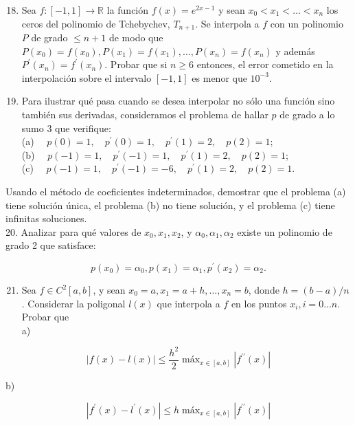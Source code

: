 \documentclass[10pt]{book}
\begin{document}
\begin{enumerate}
  \setcounter{enumi}{17}
  \item Sea $f:[-1,1] \rightarrow \mathbb{R}$ la función $f(x)=e^{2 x-1}$ y sean $x_{0}<x_{1}<\ldots<x_{n}$ los ceros del polinomio de Tchebychev, $T_{n+1}$. Se interpola a $f$ con un polinomio $P$ de grado $\leq n+1$ de modo que $P\left(x_{0}\right)=f\left(x_{0}\right), P\left(x_{1}\right)=f\left(x_{1}\right), \ldots, P\left(x_{n}\right)=f\left(x_{n}\right)$ y además $P^{\prime}\left(x_{n}\right)=f^{\prime}\left(x_{n}\right)$. Probar que si $n \geq 6$ entonces, el error cometido en la interpolación sobre el intervalo $[-1,1]$ es menor que $10^{-3}$.
  \item Para ilustrar qué pasa cuando se desea interpolar no sólo una función sino también sus derivadas, consideramos el problema de hallar $p$ de grado a lo sumo 3 que verifique:\\
(a) $\quad p(0)=1, \quad p^{\prime}(0)=1, \quad p^{\prime}(1)=2, \quad p(2)=1 ;$\\
(b) $\quad p(-1)=1, \quad p^{\prime}(-1)=1, \quad p^{\prime}(1)=2, \quad p(2)=1$;\\
(c) $\quad p(-1)=1, \quad p^{\prime}(-1)=-6, \quad p^{\prime}(1)=2, \quad p(2)=1$.
\end{enumerate}

Usando el método de coeficientes indeterminados, demostrar que el problema (a) tiene solución única, el problema (b) no tiene solución, y el problema (c) tiene infinitas soluciones.\\
20. Analizar para qué valores de $x_{0}, x_{1}, x_{2}$, y $\alpha_{0}, \alpha_{1}, \alpha_{2}$ existe un polinomio de grado 2 que satisface:

$$
p\left(x_{0}\right)=\alpha_{0}, p\left(x_{1}\right)=\alpha_{1}, p^{\prime}\left(x_{2}\right)=\alpha_{2} .
$$

\begin{enumerate}
  \setcounter{enumi}{20}
  \item Sea $f \in C^{2}[a, b]$, y sean $x_{0}=a, x_{1}=a+h, \ldots, x_{n}=b$, donde $h=(b-a) / n$. Considerar la poligonal $l(x)$ que interpola a $f$ en los puntos $x_{i}, i=0 \ldots n$. Probar que\\
a)
\end{enumerate}

$$
|f(x)-l(x)| \leq \frac{h^{2}}{2} \operatorname{máx}_{x \in[a, b]}\left|f^{\prime \prime}(x)\right|
$$

b)

$$
\left|f^{\prime}(x)-l^{\prime}(x)\right| \leq h \operatorname{máx}_{x \in[a, b]}\left|f^{\prime \prime}(x)\right|
$$
\end{document}
